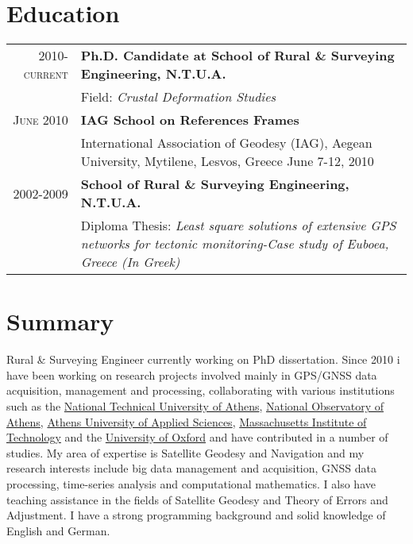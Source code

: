 \documentclass[8pt]{extarticle} %
\begin{document}
\section{Education}
\begin{tabular}{rp{13cm}}
  \textsc{2010-current} &\textbf{Ph.D. Candidate at School of Rural \& Surveying Engineering, N.T.U.A.}\\
   & Field: \textit{Crustal Deformation Studies}\\
  \textsc{June 2010} & \textbf{IAG School on References Frames}\\
    & International Association of Geodesy \small{(IAG)}, Aegean University, Mytilene, Lesvos, Greece June 7-12, 2010\\
  \textsc{2002-2009} & \textbf{School of Rural \& Surveying Engineering, N.T.U.A.}\\
  & Diploma Thesis: 
  \textit{Least square solutions of extensive GPS networks for tectonic monitoring-Case study of Euboea, Greece (In Greek)}\\
\end{tabular} \par

\section{Summary} \par
Rural \& Surveying Engineer currently working on PhD dissertation. Since 2010 i have been working on research 
projects involved mainly in GPS/GNSS data acquisition, management and processing, collaborating with various 
institutions such as the \href{http://www.ntua.gr/}{National Technical University of Athens}, 
\href{http://www.noa.gr/index.php?lang=en}{National Observatory of Athens}, 
\href{http://www.teiath.gr/?lang=en}{Athens University of Applied Sciences}, 
\href{https://web.mit.edu/}{Massachusetts Institute of Technology} and the 
\href{http://www.ox.ac.uk/}{University of Oxford} and have contributed in a number of studies. My area of expertise 
is Satellite Geodesy and Navigation and my research interests include big data management and acquisition, GNSS 
data processing, time-series analysis and computational mathematics. I also have teaching assistance in the 
fields of Satellite Geodesy and Theory of Errors and Adjustment. I have a strong programming background and
solid knowledge of English and German.
\end{document}
